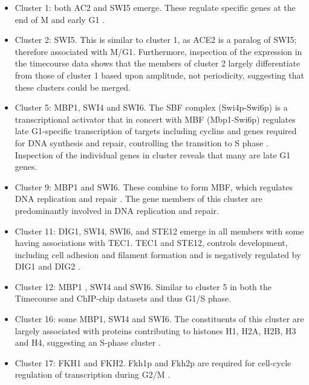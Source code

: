 \documentclass[]{article}
\begin{document}
\begin{itemize}
	\item Cluster 1: both AC2 and SWI5 emerge. These regulate specific genes at the end of M and early G1 \citep{mcbride1999distinct, simon2001serial}.
	\item Cluster 2: SWI5. This is similar to cluster 1, as ACE2 is a paralog of SWI5; therefore associated with M/G1. Furthermore, inspection of the expression in the timecourse data shows that the members of cluster 2 largely differentiate from those of cluster 1 based upon amplitude, not periodicity, suggesting that these clusters could be merged.
	\item Cluster 5: MBP1, SWI4 and SWI6. The SBF complex (Swi4p-Swi6p) is a transcriptional activator that in concert with	MBF (Mbp1-Swi6p) regulates late G1-specific transcription of targets including cyclins and genes required for DNA synthesis and repair, controlling the transition to S phase \citep{simon2001serial,iyer2001genomic, aligianni2009fission}. Inspection of the individual genes in cluster reveals that many are late G1 genes.
	\item Cluster 9: MBP1 and SWI6. These combine to form MBF, which regulates DNA replication and repair \citep{iyer2001genomic}. The gene members of this cluster are predominantly involved in DNA replication and repair.
	\item Cluster 11: DIG1, SWI4, SWI6, and STE12 emerge in all members with some having associations with TEC1. TEC1 and STE12, controls development, including cell adhesion and filament formation and is negatively regulated by DIG1 and DIG2 \citep{van2014transcription}.
	\item Cluster 12: MBP1 , SWI4 and SWI6. Similar to cluster 5 in both the Timecourse and ChIP-chip datasets and thus G1/S phase.
	\item Cluster 16: some MBP1, SWI4 and SWI6. The constituents of this cluster are largely associated with proteins contributing to histones H1, H2A, H2B, H3 and H4, suggesting an S-phase cluster \citep{ewen2000cell}.
	\item Cluster 17: FKH1 and FKH2. Fkh1p and Fkh2p are required for cell-cycle regulation of transcription during G2/M \citep{kumar2000forkhead}. 

\end{itemize}
\end{document}
